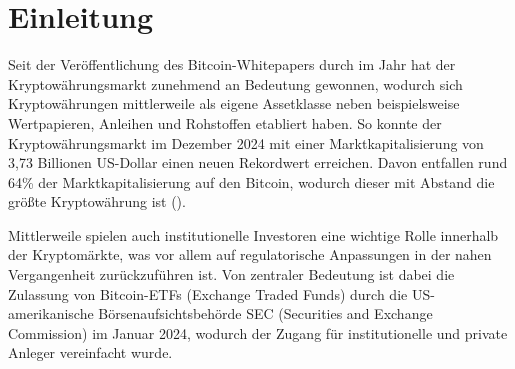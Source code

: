 \documentclass[a4paper, 12pt]{article}
\begin{document}

\setcounter{page}{1}
\renewcommand{\abstractname}{Abstrakt}
\begin{abstract}
Diese Replikationsstudie untersucht Teile der Arbeit von \textcite{Goutte2023}, in der verschiedene Deep-Learning-Modelle zur Vorhersage von Kauf- und Verkaufssignalen für Bitcoin genutzt wurden.
Konkret wird der Fokus auf die Vorhersage von Kaufsignalen mit den Modellen Long Short-Term Memory (LSTM), eXtreme Gradient Boosting (XGBoost) und der logistischen Regression gelegt.
Bei der Replikation zeigt sich, dass die grundlegenden Ergebnisse von \textcite{Goutte2023} nachvollziehbar sind und diese auch bei anderen Modellparametern und Zeiträumen bestehen bleiben.
Jedoch wird auch deutlich, dass den Autoren der Studie wesentliche Ungenauigkeiten unterlaufen sind.
So wurden in einzelnen Fällen Gleichungen verwendet, die von den in der Studie genannten Gleichungen abweichen.
Für einzelne Abbildungen wurden zudem auch Zeiträume verwendet, die vom genannten Untersuchungszeitraum abweichen.
Da zusätzlich wichtige Informationen zu den verwendeten Merkmalen und dem Vorgehen fehlen, ist eine exakte Replikation der Studie unmöglich.
Folglich kann die in dieser Arbeit angewendete Methodik von dem Vorgehen der Autoren abweichen.
\end{abstract}

\section{Einleitung}
Seit der Veröffentlichung des Bitcoin-Whitepapers durch \citeauthor{BitcoinWhitepaper} im Jahr \citeyear{BitcoinWhitepaper} hat der Kryptowährungsmarkt zunehmend an Bedeutung gewonnen, wodurch sich Kryptowährungen mittlerweile als eigene Assetklasse neben beispielsweise Wertpapieren, Anleihen und Rohstoffen etabliert haben.
 So konnte der Kryptowährungsmarkt im Dezember 2024 mit einer Marktkapitalisierung von 3,73 Billionen US-Dollar einen neuen Rekordwert erreichen.
Davon entfallen rund 64\% der Marktkapitalisierung auf den Bitcoin, wodurch dieser mit Abstand die größte Kryptowährung ist (\cite{2025a, 2025}).

Mittlerweile spielen auch institutionelle Investoren eine wichtige Rolle innerhalb der Kryptomärkte, was vor allem auf regulatorische Anpassungen in der nahen Vergangenheit zurückzuführen ist.
Von zentraler Bedeutung ist dabei die Zulassung von Bitcoin-ETFs (Exchange Traded Funds) durch die US-amerikanische Börsenaufsichtsbehörde SEC (Securities and Exchange Commission) im Januar 2024, wodurch der Zugang für institutionelle und private Anleger vereinfacht wurde.
\end{document}

